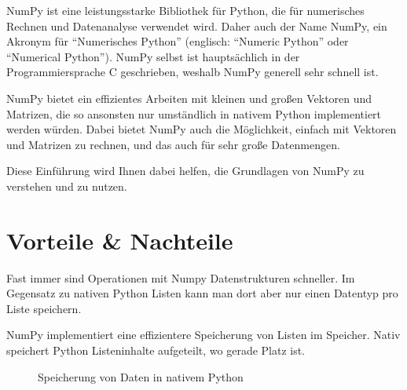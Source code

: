 \documentclass[
  letterpaper,
  DIV=11,
  numbers=noendperiod]{scrreprt}
\begin{document}
\begin{tcolorbox}
NumPy ist eine leistungsstarke Bibliothek für Python, die für
numerisches Rechnen und Datenanalyse verwendet wird. Daher auch der Name
NumPy, ein Akronym für ``Numerisches Python'' (englisch: ``Numeric
Python'' oder ``Numerical Python''). NumPy selbst ist hauptsächlich in
der Programmiersprache C geschrieben, weshalb NumPy generell sehr
schnell ist.

NumPy bietet ein effizientes Arbeiten mit kleinen und großen Vektoren
und Matrizen, die so ansonsten nur umständlich in nativem Python
implementiert werden würden. Dabei bietet NumPy auch die Möglichkeit,
einfach mit Vektoren und Matrizen zu rechnen, und das auch für sehr
große Datenmengen.

Diese Einführung wird Ihnen dabei helfen, die Grundlagen von NumPy zu
verstehen und zu nutzen.

\section{Vorteile \& Nachteile}\label{vorteile-nachteile}

Fast immer sind Operationen mit Numpy Datenstrukturen schneller. Im
Gegensatz zu nativen Python Listen kann man dort aber nur einen Datentyp
pro Liste speichern.

\begin{tcolorbox}[enhanced jigsaw, breakable, opacityback=0, left=2mm, coltitle=black, leftrule=.75mm, colframe=quarto-callout-note-color-frame, opacitybacktitle=0.6, toprule=.15mm, bottomtitle=1mm, titlerule=0mm, toptitle=1mm, title=\textcolor{quarto-callout-note-color}{\faInfo}\hspace{0.5em}{Warum ist numpy oftmals schneller?}, colbacktitle=quarto-callout-note-color!10!white, arc=.35mm, bottomrule=.15mm, rightrule=.15mm, colback=white]

NumPy implementiert eine effizientere Speicherung von Listen im
Speicher. Nativ speichert Python Listeninhalte aufgeteilt, wo gerade
Platz ist.

\begin{figure}[H]


\caption{\label{fig-python_memory}Speicherung von Daten in nativem
Python}

\end{figure}%


\end{tcolorbox}
\end{tcolorbox}
\end{document}
